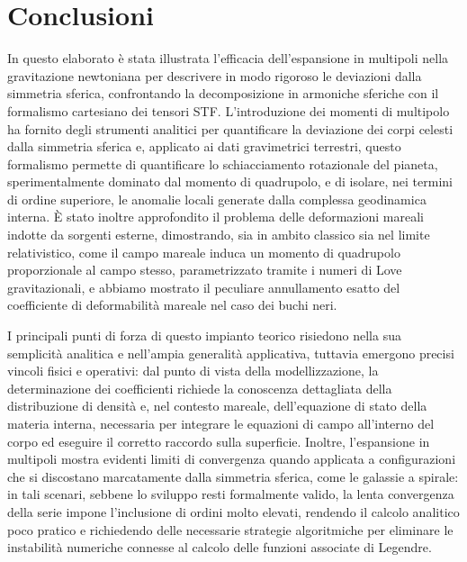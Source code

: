 \chapter{Conclusioni}

In questo elaborato è stata illustrata l'efficacia dell'espansione in multipoli nella gravitazione newtoniana per descrivere in modo rigoroso le deviazioni dalla simmetria sferica, confrontando la decomposizione in armoniche sferiche con il formalismo cartesiano dei tensori STF. L'introduzione dei momenti di multipolo ha fornito degli strumenti analitici per quantificare la deviazione dei corpi celesti dalla simmetria sferica e, applicato ai dati gravimetrici terrestri, questo formalismo permette di quantificare lo schiacciamento rotazionale del pianeta, sperimentalmente dominato dal momento di quadrupolo, e di isolare, nei termini di ordine superiore, le anomalie locali generate dalla complessa geodinamica interna. È stato inoltre approfondito il problema delle deformazioni mareali indotte da sorgenti esterne, dimostrando, sia in ambito classico sia nel limite relativistico, come il campo mareale induca un momento di quadrupolo proporzionale al campo stesso, parametrizzato tramite i numeri di Love gravitazionali, e abbiamo mostrato il peculiare annullamento esatto del coefficiente di deformabilità mareale nel caso dei buchi neri.


I principali punti di forza di questo impianto teorico risiedono nella sua semplicità analitica e nell'ampia generalità applicativa, tuttavia emergono precisi vincoli fisici e operativi: dal punto di vista della modellizzazione, la determinazione dei coefficienti richiede la conoscenza dettagliata della distribuzione di densità e, nel contesto mareale, dell'equazione di stato della materia interna, necessaria per integrare le equazioni di campo all'interno del corpo ed eseguire il corretto raccordo sulla superficie. Inoltre, l'espansione in multipoli mostra evidenti limiti di convergenza quando applicata a configurazioni che si discostano marcatamente dalla simmetria sferica, come le galassie a spirale: in tali scenari, sebbene lo sviluppo resti formalmente valido, la lenta convergenza della serie impone l'inclusione di ordini molto elevati, rendendo il calcolo analitico poco pratico e richiedendo delle necessarie strategie algoritmiche per eliminare le instabilità numeriche connesse al calcolo delle funzioni associate di Legendre.
